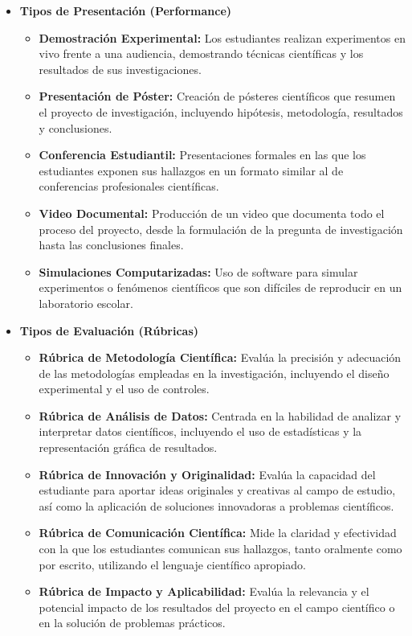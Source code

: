 \begin{itemize}
    \item \textbf{Tipos de Presentación (Performance)}
    \begin{itemize}
        \item \textbf{Demostración Experimental:}
        Los estudiantes realizan experimentos en vivo frente a una audiencia, demostrando técnicas científicas y los resultados de sus investigaciones.
        \item \textbf{Presentación de Póster:}
        Creación de pósteres científicos que resumen el proyecto de investigación, incluyendo hipótesis, metodología, resultados y conclusiones.
        \item \textbf{Conferencia Estudiantil:}
        Presentaciones formales en las que los estudiantes exponen sus hallazgos en un formato similar al de conferencias profesionales científicas.
        \item \textbf{Video Documental:}
        Producción de un video que documenta todo el proceso del proyecto, desde la formulación de la pregunta de investigación hasta las conclusiones finales.
        \item \textbf{Simulaciones Computarizadas:}
        Uso de software para simular experimentos o fenómenos científicos que son difíciles de reproducir en un laboratorio escolar.
    \end{itemize}
    \item \textbf{Tipos de Evaluación (Rúbricas)}
    \begin{itemize}
        \item \textbf{Rúbrica de Metodología Científica:}
        Evalúa la precisión y adecuación de las metodologías empleadas en la investigación, incluyendo el diseño experimental y el uso de controles.
        \item \textbf{Rúbrica de Análisis de Datos:}
        Centrada en la habilidad de analizar y interpretar datos científicos, incluyendo el uso de estadísticas y la representación gráfica de resultados.
        \item \textbf{Rúbrica de Innovación y Originalidad:}
        Evalúa la capacidad del estudiante para aportar ideas originales y creativas al campo de estudio, así como la aplicación de soluciones innovadoras a problemas científicos.
        \item \textbf{Rúbrica de Comunicación Científica:}
        Mide la claridad y efectividad con la que los estudiantes comunican sus hallazgos, tanto oralmente como por escrito, utilizando el lenguaje científico apropiado.
        \item \textbf{Rúbrica de Impacto y Aplicabilidad:}
        Evalúa la relevancia y el potencial impacto de los resultados del proyecto en el campo científico o en la solución de problemas prácticos.
    \end{itemize}
\end{itemize}




